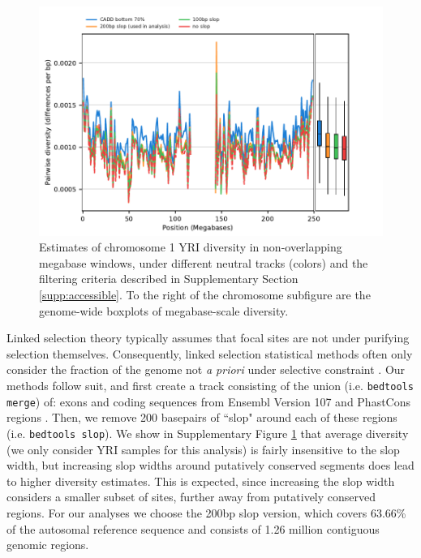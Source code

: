 \documentclass[11pt]{article}
\begin{document}
\begin{figure}[!htb]
  \centering
  \includegraphics[width=\textwidth]{figures/supplementary/neutral_tracks.pdf}

  \caption{Estimates of chromosome 1 YRI diversity in non-overlapping megabase
      windows, under different neutral tracks (colors) and the filtering
      criteria described in Supplementary Section \ref{supp:accessible}. To the
      right of the chromosome subfigure are the genome-wide boxplots of
      megabase-scale diversity. } 

  \label{suppfig:neutral-tracks}
\end{figure}

Linked selection theory typically assumes that focal sites are not under
purifying selection themselves. Consequently, linked selection statistical
methods often only consider the fraction of the genome not \emph{a priori}
under selective constraint \parencite[e.g. Appendix Section
3.1]{Murphy2022-sj}. Our methods follow suit, and first create a track
consisting of the union (i.e. \texttt{bedtools merge}) of: exons and coding
sequences from Ensembl Version 107
\parencite[]{Cunningham2022-vk} and
PhastCons regions
\parencite[]{Siepel2005-wh}. Then, we
remove 200 basepairs of ``slop" around each of these regions (i.e.
\texttt{bedtools slop}). We show in Supplementary Figure
\ref{suppfig:neutral-tracks} that average diversity (we only consider YRI
samples for this analysis) is fairly insensitive to the slop width, but
increasing slop widths around putatively conserved segments does lead to higher
diversity estimates. This is expected, since increasing the slop width
considers a smaller subset of sites, further away from putatively conserved
regions. For our analyses we choose the 200bp slop version, which covers
63.66\% of the autosomal reference sequence and consists of 1.26 million
contiguous genomic regions.
\end{document}
